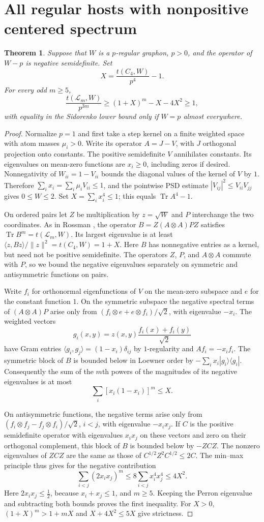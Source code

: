 \documentclass[11pt]{article}
\newtheorem{theorem}{Theorem}
\newcommand{\Tr}{\operatorname{Tr}}
\newcommand{\La}{\mathcal L}
\begin{document}
\section{All regular hosts with nonpositive centered spectrum}
\begin{theorem}\label{neg}
Suppose that $W$ is a $p$-regular graphon, $p>0$, and the operator of $W-p$ is negative semidefinite. Set
\[
 X=\frac{t(C_4,W)}{p^4}-1 .
\]
For every odd $m\ge5$,
\[
 \frac{t(\La_m,W)}{p^{3m}}\ge (1+X)^m-X-4X^2\ge1,
\]
with equality in the Sidorenko lower bound only if $W=p$ almost everywhere.
\end{theorem}
\begin{proof}
Normalize $p=1$ and first take a step kernel on a finite weighted space with atom masses $\mu_i>0$. Write its operator $A=J-V$, with $J$ orthogonal projection onto constants. The positive semidefinite $V$ annihilates constants. Its eigenvalues on mean-zero functions are $x_i\ge0$, including zeros if desired. Nonnegativity of $W_{ii}=1-V_{ii}$ bounds the diagonal values of the kernel of $V$ by $1$. Therefore $\sum_i x_i=\sum_i\mu_i V_{ii}\le1$, and the pointwise PSD estimate $|V_{ij}|^2\le V_{ii}V_{jj}$ gives $0\le W\le2$. Set $X=\sum_i x_i^4\le1$; this equals $\Tr A^4-1$.

On ordered pairs let $Z$ be multiplication by $z=\sqrt{W}$ and $P$ interchange the two coordinates. As in Rossman \cite{rossman}, the operator $B=Z(A\otimes A)PZ$ satisfies $\Tr B^m=t(\La_m,W)$. Its largest eigenvalue is at least $\langle z,Bz\rangle/\|z\|^2=t(C_4,W)=1+X$. Here $B$ has nonnegative entries as a kernel, but need not be positive semidefinite. The operators $Z$, $P$, and $A\otimes A$ commute with $P$, so we bound the negative eigenvalues separately on symmetric and antisymmetric functions on pairs.

Write $f_i$ for orthonormal eigenfunctions of $V$ on the mean-zero subspace and $e$ for the constant function $1$. On the symmetric subspace the negative spectral terms of $(A\otimes A)P$ arise only from $(f_i\otimes e+e\otimes f_i)/\sqrt2$, with eigenvalue $-x_i$. The weighted vectors
\[
 g_i(x,y)=z(x,y)\frac{f_i(x)+f_i(y)}{\sqrt2}
\]
have Gram entries $\langle g_i,g_j\rangle=(1-x_i)\delta_{ij}$ by $1$-regularity and $A f_i=-x_i f_i$. The symmetric block of $B$ is bounded below in Loewner order by $-\sum_i x_i |g_i\rangle\langle g_i|$. Consequently the sum of the $m$th powers of the magnitudes of its negative eigenvalues is at most
\[
 \sum_i [x_i(1-x_i)]^m\le X.
\]

On antisymmetric functions, the negative terms arise only from $(f_i\otimes f_j-f_j\otimes f_i)/\sqrt2$, $i<j$, with eigenvalue $-x_ix_j$. If $C$ is the positive semidefinite operator with eigenvalues $x_ix_j$ on these vectors and zero on their orthogonal complement, this block of $B$ is bounded below by $-ZCZ$. The nonzero eigenvalues of $ZCZ$ are the same as those of $C^{1/2}Z^2C^{1/2}\le2C$. The min--max principle thus gives for the negative contribution
\[
 \sum_{i<j}(2x_ix_j)^m
 \le 8\sum_{i<j}x_i^4x_j^4\le4X^2 .
\]
Here $2x_ix_j\le\frac12$, because $x_i+x_j\le1$, and $m\ge5$. Keeping the Perron eigenvalue and subtracting both bounds proves the first inequality. For $X>0$, $(1+X)^m>1+mX$ and $X+4X^2\le5X$ give strictness.


\end{proof}
\end{document}
